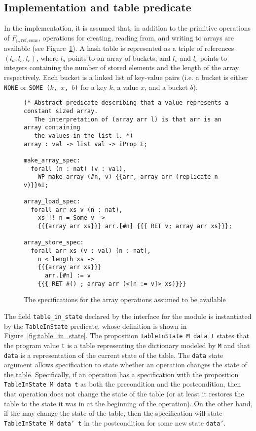 \documentclass[10pt,a4paper]{article}
\begin{document}
\subsection{Implementation and table predicate}
In the implementation, it is assumed that, in addition to the primitive operations of $F_{\mathrm{\mu, ref, conc}}$, operations for creating, reading from, and writing to arrays are available (see Figure~\ref{fig:arr_spec}). A hash table is represented as a triple of references $(l_a, l_s, l_c)$, where $l_a$ points to an array of buckets, and $l_s$ and $l_c$ points to integers containing the number of stored elements and the length of the array respectively. Each bucket is a linked list of key-value pairs (i.e. a bucket is either \texttt{NONE} or \texttt{SOME ($k$, $x$, $b$)} for a key $k$, a value $x$, and a bucket $b$).

\begin{figure}
\begin{verbatim}
(* Abstract predicate describing that a value represents a constant sized array.
   The interpretation of (array arr l) is that arr is an array containing
   the values in the list l. *)
array : val -> list val -> iProp Σ;

make_array_spec:
  forall (n : nat) (v : val),
    WP make_array (#n, v) {{arr, array arr (replicate n v)}}%I;

array_load_spec:
  forall arr xs v (n : nat),
    xs !! n = Some v ->
    {{{array arr xs}}} arr.[#n] {{{ RET v; array arr xs}}};

array_store_spec:
  forall arr xs (v : val) (n : nat),
    n < length xs ->
    {{{array arr xs}}}
      arr.[#n] := v
    {{{ RET #() ; array arr (<[n := v]> xs)}}}
\end{verbatim}
\caption{The specifications for the array operations assumed to be available}
\label{fig:arr_spec}
\end{figure}

The field \texttt{table\_in\_state} declared by the interface for the module is instantiated by the \texttt{TableInState} predicate, whose definition is shown in Figure~\ref{fig:table_in_state}. The proposition \texttt{TableInState M data t} states that the program value \texttt{t} is a table representing the dictionary modeled by \texttt{M} and that \texttt{data} is a representation of the current state of the table. The \texttt{data} state argument allows specification to state whether an operation changes the state of the table. Specifically, if an operation has a specification with the proposition \texttt{TableInState M data t} as both the precondition and the postcondition, then that operation does not change the state of the table (or at least it restores the table to the state it was in at the beginning of the operation). On the other hand, if the may change the state of the table, then the specification will state \texttt{TableInState M data' t} in the postcondition for some new state \texttt{data'}.
\end{document}

